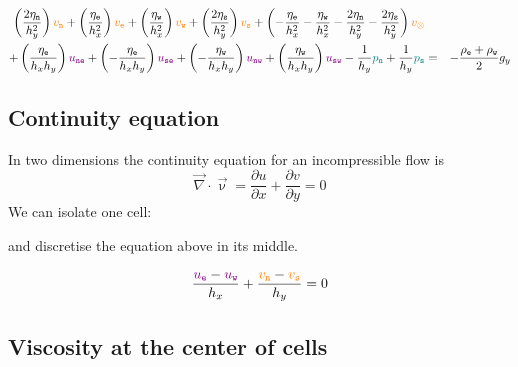 \begin{mdframed}[backgroundcolor=blue!5]
\begin{eqnarray}
\left( \frac{2\eta_{\tt n}}{h_y^2} \right) {\color{orange} v_{\tt n}} +
\left( \frac{ \eta_{\tt e}}{h_x^2} \right) {\color{orange} v_{\tt e}} +
\left( \frac{ \eta_{\tt w}}{h_x^2} \right) {\color{orange} v_{\tt w}} +
\left( \frac{2\eta_{\tt s}}{h_y^2} \right) {\color{orange} v_{\tt s}} +
\left( 
-\frac{\eta_{\tt e}}{h_x^2} 
-\frac{\eta_{\tt w}}{h_x^2} 
-\frac{2\eta_{\tt n}}{h_y^2} 
-\frac{2\eta_{\tt s}}{h_y^2} 
\right) {\color{orange} v_\otimes} \nonumber\\
+
\left( \frac{\eta_{\tt e}}{h_x h_y} \right) {\color{violet} u_{\tt ne}} +
\left(-\frac{\eta_{\tt e}}{h_x h_y} \right) {\color{violet} u_{\tt se}} +
\left(-\frac{\eta_{\tt w}}{h_x h_y} \right) {\color{violet} u_{\tt nw}} +
\left( \frac{\eta_{\tt w}}{h_x h_y} \right) {\color{violet} u_{\tt sw}} 
-\frac{1}{h_y} {\color{teal}p_{\tt n}} + \frac{1}{h_y} {\color{teal}p_{\tt s}}
&=& -\frac{\rho_{\tt e}+\rho_{\tt w}}{2} g_y \nonumber\\
\label{eq:fdmstokes2}
\end{eqnarray}
\end{mdframed}


\subsection{Continuity equation}

In two dimensions the continuity equation for an incompressible flow is
\[
\vec\nabla \cdot \vec\upnu 
= 
\frac{\partial u}{\partial x} 
+
\frac{\partial v}{\partial y} 
=0
\]
We can isolate one cell:



and discretise the equation above in its middle.
\begin{mdframed}[backgroundcolor=blue!5]
\begin{equation}
\frac{{\color{violet}u_{\tt e}}-{\color{violet}u_{\tt w}}}{h_x} 
+
\frac{{\color{orange}v_{\tt n}}-{\color{orange}v_{\tt s}}}{h_y} 
=0
\label{eq:fdmstokes3}
\end{equation}
\end{mdframed}



\subsection{Viscosity at the center of cells}


